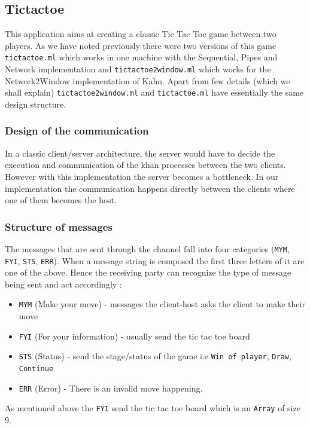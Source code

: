 \documentclass[10pt,a4paper]{article}
\begin{document}
\subsection{Tictactoe}

This application aims at creating a classic Tic Tac Toe game between two players. As we have noted previously there were two versions of this game \texttt{tictactoe.ml} which works in one machine with the Sequential, Pipes and Network implementation and \texttt{tictactoe2window.ml} which works for the Network2Window implementation of Kahn. Apart from few details (which we shall explain)  \texttt{tictactoe2window.ml} and \texttt{tictactoe.ml} have essentially the same design structure.

\subsubsection{Design of the communication }

In a classic client/server architecture, the server would have to decide the execution and communication of the khan processes between the two clients. However with this implementation the server becomes a bottleneck. In our implementation the communication happens directly between the clients where one of them becomes the host.

\subsubsection{Structure of messages}
The messages that are sent through the channel fall into four categories (\texttt{MYM}, \texttt{FYI}, \texttt{STS}, \texttt{ERR}). When a message string is composed the first three letters of it are one of the above. Hence the receiving party can recognize the type of message being sent and act accordingly :
\begin{itemize}
\item \texttt{MYM} (Make your move) - messages the client-host asks the client to make their move
\item \texttt{FYI} (For your information) - usually send the tic tac toe board
\item \texttt{STS} (Status) - send the stage/status of the game i.e \texttt{Win of player}, \texttt{Draw}, \texttt{Continue}
\item \texttt{ERR} (Error) - There is an invalid move happening.
\end{itemize}
As mentioned above the \texttt{FYI} send the tic tac toe board which is an \texttt{Array} of size 9.
\end{document}
